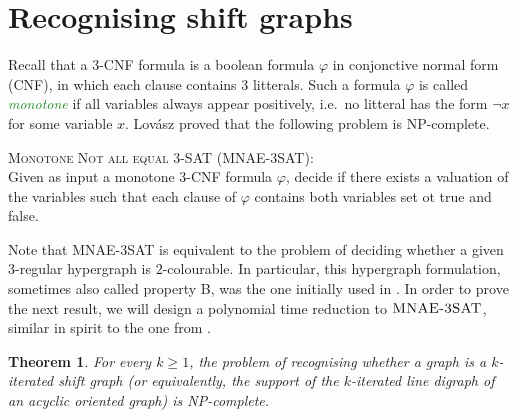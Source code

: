 \documentclass[11pt,a4aper]{article}
\newtheorem{theorem}{Theorem}
\newenvironment{csproblem}[1]{\textsc{#1}:\\}{}
\renewcommand{\ge}{\geqslant}
\renewcommand{\phi}{\varphi}
\newcommand*{\MNAE}{\textsc{MNAE-3SAT} }
\newcommand{\defin}[1]{\emph{\textcolor{ForestGreen}{#1}}}
\begin{document}
\section{Recognising shift graphs}\label{sec:recognition}

Recall that a $3$-CNF formula is a boolean formula $\varphi$ in conjonctive normal form (CNF), in which each clause contains 3 litterals. Such a formula $\varphi$ is called \defin{monotone} if all variables always appear positively, i.e.\ no litteral has the form $\neg x$ for some variable $x$.  
Lov\'asz \cite{lovasz1973Covering} proved that the following problem is NP-complete.

\begin{csproblem}{Monotone Not all equal 3-SAT (MNAE-3SAT)}
  Given as input a monotone 3-CNF formula $\phi$, decide if there exists a valuation of
  the variables such that each clause of $\phi$ contains both variables set ot true and false.
\end{csproblem}

Note that \MNAE is equivalent to the problem of deciding whether a given
$3$-regular hypergraph is $2$-colourable. In particular, this hypergraph
formulation, sometimes also called property B,  was the one initially used in \cite{lovasz1973Covering}. In order to prove the next result, we will design a polynomial time reduction to $\MNAE$, similar in spirit to the one from \cite{chvatal1990Note}.

\begin{theorem}
  For every $k \ge 1$, the problem of recognising whether a graph is a $k$-iterated shift graph (or equivalently, the
  support of the $k$-iterated line digraph of
  an acyclic oriented graph) is NP-complete.
\end{theorem}
\end{document}
